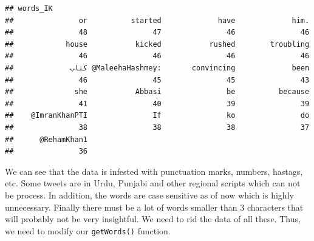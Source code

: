 \documentclass[]{article}
\begin{document}
\begin{verbatim}
## words_IK
##               or          started             have             him. 
##               48               47               46               46 
##            house           kicked           rushed        troubling 
##               46               46               46               46 
##             کتاب @MaleehaHashmey:       convincing             been 
##               46               45               45               43 
##              she           Abbasi               be          because 
##               41               40               39               39 
##    @ImranKhanPTI               If               ko               do 
##               38               38               38               37 
##      @RehamKhan1 
##               36
\end{verbatim}

We can see that the data is infested with punctuation marks, numbers,
hastags, etc. Some tweets are in Urdu, Punjabi and other regional
scripts which can not be process. In addition, the words are case
sensitive as of now which is highly unnecessary. Finally there must be a
lot of words smaller than 3 characters that will probably not be very
insightful. We need to rid the data of all these. Thus, we need to
modify our \texttt{getWords()} function.
\end{document}
